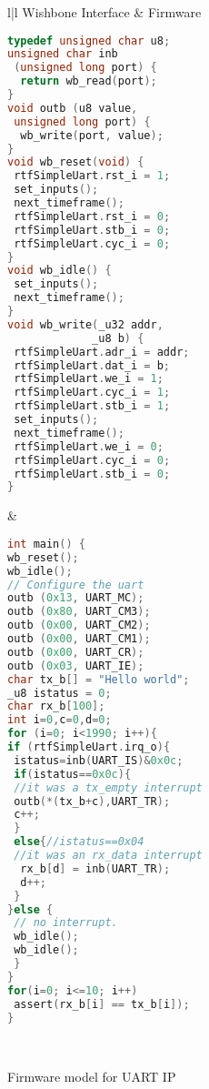 \begin{figure*}
\scriptsize
\begin{tabular}{l|l}
\hline
Wishbone Interface & Firmware \\
\hline
\begin{lstlisting}[mathescape=true,language=C]
typedef unsigned char u8;
unsigned char inb 
 (unsigned long port) {
  return wb_read(port);
}
void outb (u8 value, 
 unsigned long port) {
  wb_write(port, value);
}
void wb_reset(void) {
 rtfSimpleUart.rst_i = 1;
 set_inputs();
 next_timeframe();
 rtfSimpleUart.rst_i = 0;
 rtfSimpleUart.stb_i = 0; 
 rtfSimpleUart.cyc_i = 0;
}
void wb_idle() {
 set_inputs();
 next_timeframe();
}
void wb_write(_u32 addr, 
             _u8 b) {
 rtfSimpleUart.adr_i = addr;
 rtfSimpleUart.dat_i = b;
 rtfSimpleUart.we_i = 1;
 rtfSimpleUart.cyc_i = 1;
 rtfSimpleUart.stb_i = 1;
 set_inputs();
 next_timeframe();
 rtfSimpleUart.we_i = 0;
 rtfSimpleUart.cyc_i = 0;
 rtfSimpleUart.stb_i = 0;
}
\end{lstlisting}
&
\begin{lstlisting}[mathescape=true,language=C]
int main() {
wb_reset();
wb_idle();
// Configure the uart
outb (0x13, UART_MC);  
outb (0x80, UART_CM3);
outb (0x00, UART_CM2);
outb (0x00, UART_CM1);
outb (0x00, UART_CR);  
outb (0x03, UART_IE); 
char tx_b[] = "Hello world";
_u8 istatus = 0;
char rx_b[100];
int i=0,c=0,d=0;
for (i=0; i<1990; i++){
if (rtfSimpleUart.irq_o){
 istatus=inb(UART_IS)&0x0c;
 if(istatus==0x0c){
 //it was a tx_empty interrupt
 outb(*(tx_b+c),UART_TR);
 c++;
 }
 else{//istatus==0x04
 //it was an rx_data interrupt
  rx_b[d] = inb(UART_TR);
  d++;
 }
}else {
 // no interrupt. 
 wb_idle();
 wb_idle();
 }
}
for(i=0; i<=10; i++)
 assert(rx_b[i] == tx_b[i]);
}
\end{lstlisting}
\\
\hline
\end{tabular}
\caption{Firmware model for UART IP}
\label{firmware} 
\end{figure*}

\newpage
